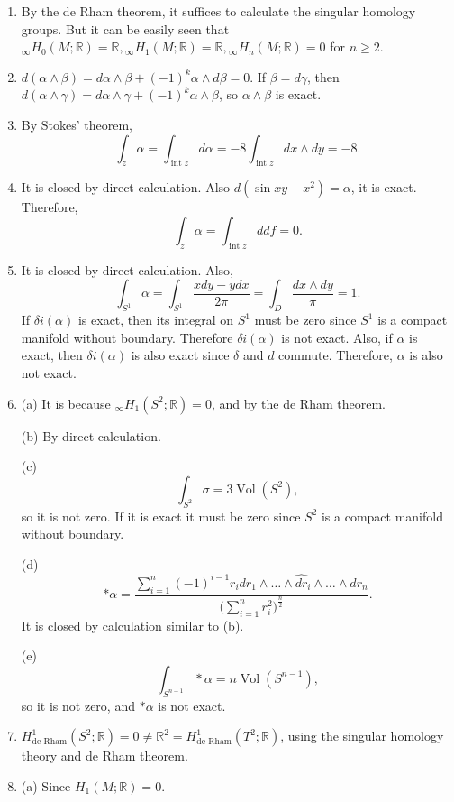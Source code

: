 \begin{enumerate}
(b) By the de Rham theorem, it suffices to show that the $0$-th singular homology group is $\mathbb{R}$. 
But since it is isomorphic to the free $\mathbb{R}$-module generated by the path-components, the result follows.
\item By the de Rham theorem, it suffices to calculate the singular homology groups. 
But it can be easily seen that ${ }_{\infty} H_{0}(M ; \mathbb{R})=\mathbb{R}, { }_{\infty} H_{1}(M ; \mathbb{R})=\mathbb{R}, { }_{\infty} H_{n}(M ; \mathbb{R})=0$ for $n \geq 2$.
\item $d(\alpha \wedge \beta)=d \alpha \wedge \beta+(-1)^{k} \alpha \wedge d \beta=0$. 
If $\beta=d \gamma$, then $d(\alpha \wedge \gamma)=d \alpha \wedge \gamma+(-1)^{k} \alpha \wedge \beta$, so $\alpha \wedge \beta$ is exact.
\item By Stokes' theorem,
\[\int_{z} \alpha=\int_{\operatorname{int}z} d \alpha
=-8 \int_{\operatorname{int}z} dx \wedge dy=-8.\]
\item It is closed by direct calculation. Also $d(\sin xy+x^{2})=\alpha$, it is exact. Therefore,
\[\int_{z} \alpha=\int_{\operatorname{int}z} d d f=0.\]
\item It is closed by direct calculation. Also,
\[\int_{S^{1}} \alpha=\int_{S^{1}} \frac{x dy-y dx}{2 \pi}=\int_{D} \frac{dx \wedge dy}{\pi}=1.\]
If $\delta i(\alpha)$ is exact, then its integral on $S^{1}$ must be zero since $S^{1}$ is a compact manifold without boundary. 
Therefore $\delta i(\alpha)$ is not exact. Also, if $\alpha$ is exact, then $\delta i(\alpha)$ is also exact since $\delta$ and $d$ commute. 
Therefore, $\alpha$ is also not exact.
\item (a) It is because ${ }_{\infty} H_{1}(S^{2} ; \mathbb{R})=0$, and by the de Rham theorem.

(b) By direct calculation.

(c) \[\int_{S^{2}} \sigma=3 \operatorname{Vol}(S^{2}),\]
so it is not zero. If it is exact it must be zero since $S^{2}$ is a compact manifold without boundary.

(d) \[* \alpha=\frac{\sum_{i=1}^{n}(-1)^{i-1} r_{i} d r_{1} \wedge \ldots \wedge \widehat{d r}_{i} \wedge \ldots \wedge d r_{n}}{\big(\sum_{i=1}^{n} r_{i}^{2}\big)^{\frac{n}{2}}}.\]
It is closed by calculation similar to (b).

(e) \[\int_{S^{n-1}} * \alpha=n \operatorname{Vol}(S^{n-1}),\]
so it is not zero, and $* \alpha$ is not exact.
\item $H_{\text{de Rham}}^{1}(S^{2} ; \mathbb{R})=0 
\neq \mathbb{R}^{2}=H_{\text {de Rham}}^{1}(T^{2} ; \mathbb{R})$, 
using the singular homology theory and de Rham theorem.
\item (a) Since $H_{1}(M ; \mathbb{R})=0$.


\end{enumerate}

